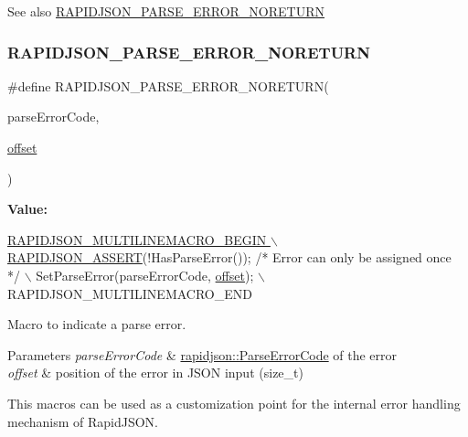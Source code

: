 \begin{DoxySeeAlso}{See also}
\hyperlink{group__RAPIDJSON__ERRORS_ga7f8c4265b2edda78568ae3338aaf1461}{R\+A\+P\+I\+D\+J\+S\+O\+N\+\_\+\+P\+A\+R\+S\+E\+\_\+\+E\+R\+R\+O\+R\+\_\+\+N\+O\+R\+E\+T\+U\+RN} 
\end{DoxySeeAlso}
\mbox{\label{group__RAPIDJSON__ERRORS_ga7f8c4265b2edda78568ae3338aaf1461}} 
\subsubsection{\texorpdfstring{R\+A\+P\+I\+D\+J\+S\+O\+N\+\_\+\+P\+A\+R\+S\+E\+\_\+\+E\+R\+R\+O\+R\+\_\+\+N\+O\+R\+E\+T\+U\+RN}{RAPIDJSON\_PARSE\_ERROR\_NORETURN}}
{\footnotesize\ttfamily \#define R\+A\+P\+I\+D\+J\+S\+O\+N\+\_\+\+P\+A\+R\+S\+E\+\_\+\+E\+R\+R\+O\+R\+\_\+\+N\+O\+R\+E\+T\+U\+RN(\begin{DoxyParamCaption}\item[{}]{parse\+Error\+Code,  }\item[{}]{\hyperlink{imgui__impl__opengl3__loader_8h_ae1b92ae085ddef4b1cdca7d749339fb0}{offset} }\end{DoxyParamCaption})}

{\bfseries Value\+:}
\begin{DoxyCode}
\hyperlink{group__RAPIDJSON__CONFIG_gabeba18d612187bad2ac62aed9276d47c}{RAPIDJSON\_MULTILINEMACRO\_BEGIN \(\backslash\)}
\hyperlink{group__RAPIDJSON__CONFIG_gabeba18d612187bad2ac62aed9276d47c}{    RAPIDJSON\_ASSERT}(!HasParseError()); \textcolor{comment}{/* Error can only be assigned once */} \(\backslash\)
    SetParseError(parseErrorCode, \hyperlink{imgui__impl__opengl3__loader_8h_ae1b92ae085ddef4b1cdca7d749339fb0}{offset}); \(\backslash\)
    RAPIDJSON\_MULTILINEMACRO\_END
\end{DoxyCode}


Macro to indicate a parse error. 


\begin{DoxyParams}{Parameters}
{\em parse\+Error\+Code} & \hyperlink{group__RAPIDJSON__ERRORS_ga8d4b32dfc45840bca189ade2bbcb6ba7}{rapidjson\+::\+Parse\+Error\+Code} of the error \\
\hline
{\em offset} & position of the error in J\+S\+ON input ({\ttfamily size\+\_\+t})\\
\hline
\end{DoxyParams}
This macros can be used as a customization point for the internal error handling mechanism of Rapid\+J\+S\+ON.

